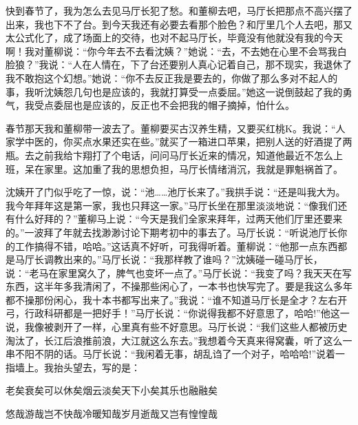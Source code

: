 \documentclass[12pt,oneside]{book}
\begin{document}
快到春节了，我为怎么去见马厅长犯了愁。和董柳去吧，马厅长把那点不高兴摆了出来，我也下不了台。到今天我还有必要去看那个脸色？和厅里几个人去吧，那又太公式化了，成了场面上的交待，也对不起马厅长，毕竟没有他就没有我的今天啊！我对董柳说：``你今年去不去看沈姨？''她说：``去，不去她在心里不会骂我白脸狼？''我说：``人在人情在，下了台还要别人真心记着自己，那不现实，我退休了我不敢抱这个幻想。''她说：``你不去反正我是要去的，你做了那么多对不起人的事，我听沈姨怨几句也是应该的，我就打算受一点委屈。''她这一说倒鼓起了我的勇气，我受点委屈也是应该的，反正也不会把我的帽子摘掉，怕什么。

春节那天我和董柳带一波去了。董柳要买古汉养生精，又要买红桃K。我说：``人家学中医的，你买点水果还实在些。''就买了一箱进口苹果，把别人送的好酒提了两瓶。去之前我给卞翔打了个电话，问问马厅长近来的情况，知道他最近不怎么上班，呆在家里。这加重了我的思想负担，马厅长情绪消沉，我就是罪魁祸首了。

沈姨开了门似乎吃了一惊，说：``池\ldots\ldots 池厅长来了。''我拱手说：``还是叫我大为。我今年拜年这是第一家，我也只拜这一家。''马厅长坐在那里淡淡地说：``像我们还有什么好拜的？''董柳马上说：``今天是我们全家来拜年，过两天他们厅里还要来的。''一波拜了年就去找渺渺讨论下期考初中的事去了。马厅长说：``听说池厅长你的工作搞得不错，哈哈。''这话真不好听，可我得听着。董柳说：``他那一点东西都是马厅长调教出来的。''马厅长说：``我那样教了谁吗？''沈姨碰一碰马厅长，说：``老马在家里窝久了，脾气也变坏一点了。''马厅长说：``我变了吗？我天天在写东西，这半年多我清闲了，不操那些闲心了，一本书也快写完了。要是我这么多年都不操那份闲心，我十本书都写出来了。''我说：``谁不知道马厅长是全才？左右开弓，行政科研都是一把好手！''马厅长说：``你说得我都不好意思了，哈哈!''他这一说，我像被剥开了一样，心里真有些不好意思。马厅长说：``我们这些人都被历史淘汰了，长江后浪推前浪，大江就这么东去。''我想着今天真来得窝囊，听了这么一串不阳不阴的话。马厅长说：``我闲着无事，胡乱诌了一个对子，哈哈哈!''说着一指墙上。我抬头望去，写的是：

老矣衰矣可以休矣烟云淡矣天下小矣其乐也融融矣

悠哉游哉岂不快哉冷暖知哉岁月逝哉又岂有惶惶哉
\end{document}
